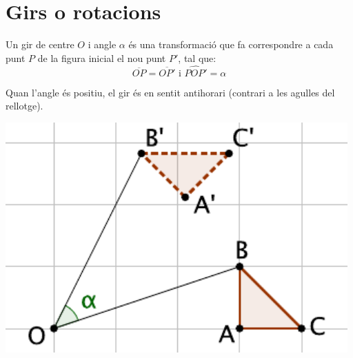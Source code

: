 \pagebreak

\section{Girs o rotacions}

\begin{theorybox}[Girs]
	 
	\begin{minipage}{0.5\textwidth}
		Un gir de centre $O$ i angle $\alpha$ és una transformació que fa correspondre a cada punt $P$ de la figura inicial el nou punt $P'$, tal que:
		\[  \overline{OP}=\overline{OP'}  \text{  i  }  \widehat{POP'}=\alpha \]
		
		Quan l'angle és positiu, el gir és en sentit antihorari (contrari a les agulles del rellotge).
	\end{minipage}
	\begin{minipage}{0.5\textwidth}
		\centering
		\includegraphics[width=0.985\textwidth]{img-10/rotacio}
		
	\end{minipage}
	
	
\end{theorybox}

